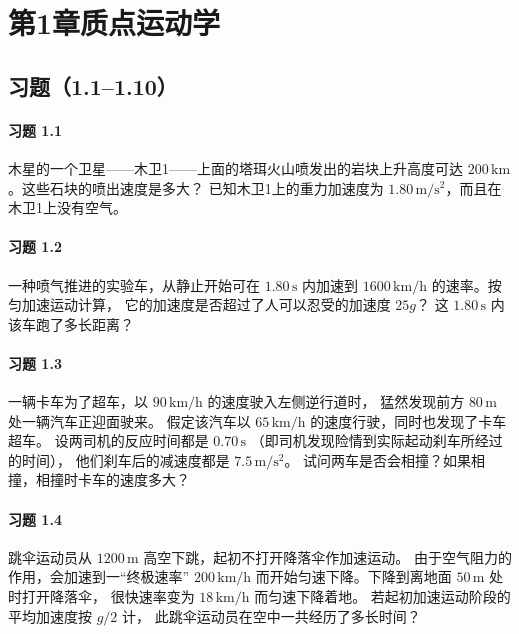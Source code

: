 \section*{第1章\quad 质点运动学}
\subsection*{习题（1.1--1.10）}

\paragraph{习题 1.1}
木星的一个卫星——木卫1——上面的塔珥火山喷发出的岩块上升高度可达
\(200\,\mathrm{km}\)。这些石块的喷出速度是多大？
已知木卫1上的重力加速度为 \(1.80\,\mathrm{m/s^2}\)，而且在木卫1上没有空气。

\paragraph{习题 1.2}
一种喷气推进的实验车，从静止开始可在 \(1.80\,\mathrm{s}\) 内加速到
\(1600\,\mathrm{km/h}\) 的速率。按匀加速运动计算，
它的加速度是否超过了人可以忍受的加速度 \(25g\)？
这 \(1.80\,\mathrm{s}\) 内该车跑了多长距离？

\paragraph{习题 1.3}
一辆卡车为了超车，以 \(90\,\mathrm{km/h}\) 的速度驶入左侧逆行道时，
猛然发现前方 \(80\,\mathrm{m}\) 处一辆汽车正迎面驶来。
假定该汽车以 \(65\,\mathrm{km/h}\) 的速度行驶，同时也发现了卡车超车。
设两司机的反应时间都是 \(0.70\,\mathrm{s}\)
（即司机发现险情到实际起动刹车所经过的时间），
他们刹车后的减速度都是 \(7.5\,\mathrm{m/s^2}\)。
试问两车是否会相撞？如果相撞，相撞时卡车的速度多大？

\paragraph{习题 1.4}
跳伞运动员从 \(1200\,\mathrm{m}\) 高空下跳，起初不打开降落伞作加速运动。
由于空气阻力的作用，会加速到一“终极速率” \(200\,\mathrm{km/h}\)
而开始匀速下降。下降到离地面 \(50\,\mathrm{m}\) 处时打开降落伞，
很快速率变为 \(18\,\mathrm{km/h}\) 而匀速下降着地。
若起初加速运动阶段的平均加速度按 \(g/2\) 计，
此跳伞运动员在空中一共经历了多长时间？

